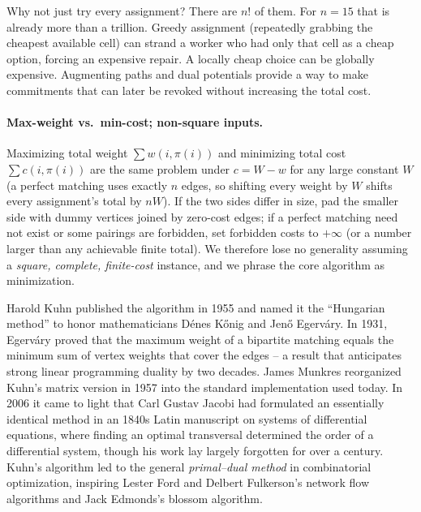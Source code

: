 \begin{intuitionbox}
Why not just try every assignment? There are $n!$ of them. For $n=15$ that is already more than a trillion. Greedy assignment (repeatedly grabbing the cheapest available cell) can strand a worker who had only that cell as a cheap option, forcing an expensive repair. A locally cheap choice can be globally expensive. Augmenting paths and dual potentials provide a way to make commitments that can later be revoked without increasing the total cost.
\end{intuitionbox}

\paragraph{Max-weight vs.\ min-cost; non-square inputs.} Maximizing total weight $\sum w(i,\pi(i))$ and minimizing total cost $\sum c(i,\pi(i))$ are the same problem under $c=W-w$ for any large constant $W$ (a perfect matching uses exactly $n$ edges, so shifting every weight by $W$ shifts every assignment's total by $nW$). If the two sides differ in size, pad the smaller side with dummy vertices joined by zero-cost edges; if a perfect matching need not exist or some pairings are forbidden, set forbidden costs to $+\infty$ (or a number larger than any achievable finite total). We therefore lose no generality assuming a \emph{square, complete, finite-cost} instance, and we phrase the core algorithm as minimization.

\begin{historybox}
Harold Kuhn published the algorithm in 1955 and named it the ``Hungarian method'' to honor mathematicians D\'enes K\H{o}nig and Jen\H{o} Egerv\'ary. In 1931, Egerv\'ary proved that the maximum weight of a bipartite matching equals the minimum sum of vertex weights that cover the edges -- a result that anticipates strong linear programming duality by two decades. James Munkres reorganized Kuhn's matrix version in 1957 into the standard implementation used today. In 2006 it came to light that Carl Gustav Jacobi had formulated an essentially identical method in an 1840s Latin manuscript on systems of differential equations, where finding an optimal transversal determined the order of a differential system, though his work lay largely forgotten for over a century. Kuhn's algorithm led to the general \emph{primal--dual method} in combinatorial optimization, inspiring Lester Ford and Delbert Fulkerson's network flow algorithms and Jack Edmonds's blossom algorithm. 
\end{historybox}

